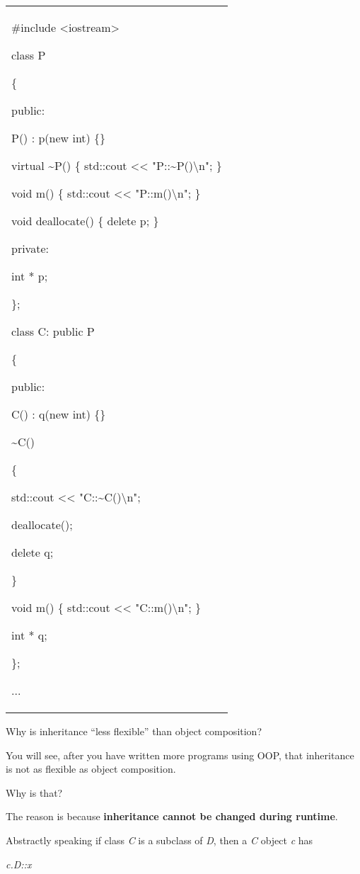\documentclass[
]{article}
\begin{document}
\begin{longtable}[]{@{}
  >{\raggedright\arraybackslash}p{}@{}}
\toprule\noalign{}
 \\
\midrule\noalign{}
\endhead
\bottomrule\noalign{}
\endlastfoot
\#include \textless iostream\textgreater{}

class P

\{

public:

P() : p(new int) \{\}

\textbf{ }virtual \textasciitilde P() \{ std::cout \textless\textless{}
"P::\textasciitilde P()\textbackslash n"; \}

void m() \{ std::cout \textless\textless{} "P::m()\textbackslash n"; \}

void deallocate() \{ delete p; \}

private:

int * p;

\};

class C: public P

\{

public:

C() : q(new int) \{\}

\textasciitilde C()

\{

std::cout \textless\textless{} "C::\textasciitilde C()\textbackslash n";

deallocate();

delete q;

\}

void m() \{ std::cout \textless\textless{} "C::m()\textbackslash n"; \}

int * q;

\};

... \\
\end{longtable}

Why is inheritance ``less flexible'' than object composition?

You will see, after you have written more programs using OOP, that
inheritance is not as flexible as object composition.

Why is that?

The reason is because \textbf{inheritance cannot be changed during
runtime}.

Abstractly speaking if class \emph{C} is a subclass of \emph{D}, then a
\emph{C} object \emph{c} has

\emph{c.D::x}
\end{document}
